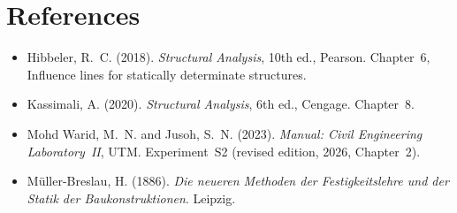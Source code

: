 \documentclass[11pt,a4paper]{article}
\begin{document}
\section*{References}
\begin{itemize}
  \item Hibbeler, R.~C. (2018). \emph{Structural Analysis}, 10th ed., Pearson. Chapter~6, Influence lines for statically determinate structures.
  \item Kassimali, A. (2020). \emph{Structural Analysis}, 6th ed., Cengage. Chapter~8.
  \item Mohd Warid, M.~N. and Jusoh, S.~N. (2023). \emph{Manual: Civil Engineering Laboratory~II}, UTM. Experiment~S2 (revised edition, 2026, Chapter~2).
  \item Müller-Breslau, H. (1886). \emph{Die neueren Methoden der Festigkeitslehre und der Statik der Baukonstruktionen}. Leipzig.
\end{itemize}
\end{document}

